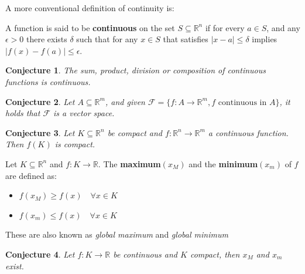 \documentclass[aspectratio=169]{beamer}
\newtheorem{proposition}{Conjecture}[section]
\begin{document}
\begin{frame}
    
    A more conventional definition of continuity is:
    
    \begin{definition}
     A function is said to be \textbf{continuous} on the set $S\subseteq\mathbb{R}^n$ if for every $a\in S$, and any $\epsilon>0$ there exists $\delta$ such that for any $x\in S$ that satisfies $|x-a|\leq \delta$ implies $|f(x)-f(a)|\leq \epsilon$.
    \end{definition}
    
    
\end{frame}

\begin{frame}

    \begin{proposition}
        The sum, product, division or composition of continuous functions is continuous.
    \end{proposition}

    \begin{proposition}
        Let $A\subseteq\mathbb{R}^m$, and given $\mathcal{F}=\{f:A\rightarrow\mathbb{R}^m, f \text{ continuous in } A\}$, it holds that $\mathcal{F}$ is a vector space.
    \end{proposition}
\end{frame}

\begin{frame}
    \begin{proposition}
        Let $K\subseteq\mathbb{R}^n$ be compact and $f:\mathbb{R}^n\rightarrow\mathbb{R}^m$ a continuous function. Then $f(K)$ is compact.
    \end{proposition}
\end{frame}

\begin{frame}
    \begin{definition}
        Let $K\subseteq\mathbb{R}^n$ and $f:K\rightarrow\mathbb{R}$. The \textbf{maximum}$(x_M)$ and the \textbf{minimum}$(x_m)$ of $f$ are defined as:
        \begin{itemize}
            \item $f(x_M)\geq f(x) \quad \forall x\in K$
            \item $f(x_m)\leq f(x) \quad \forall x\in K$
        \end{itemize}
        
        These are also known as \emph{global maximum} and \emph{global minimum}
    \end{definition}
    
    \begin{proposition}
        Let $f:K\rightarrow\mathbb{R}$ be continuous and $K$ compact, then $x_M$ and $x_m$ exist.
    \end{proposition}
\end{frame}
\end{document}
